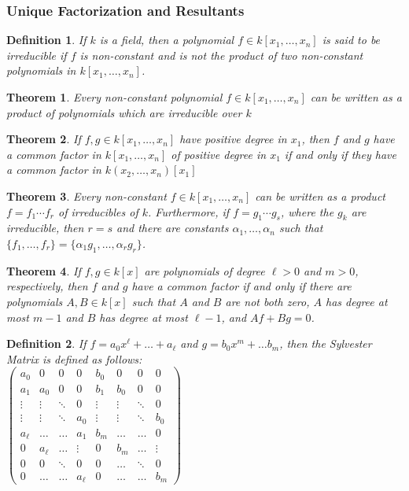 \documentclass{article}
\theoremstyle{mystyle}
\newtheorem{theorem}{Theorem}[section]
\newtheorem{definition}{Definition}[section]
\begin{document}
\subsubsection{Unique Factorization and Resultants}
\begin{definition}
If $k$ is a field, then a polynomial $f\in k[x_1,\hdots ,x_n]$ is said to be irreducible if $f$ is non-constant and is not the product of two non-constant polynomials in $k[x_1,\hdots ,x_n]$.
\end{definition}
\begin{theorem}
Every non-constant polynomial $f\in k[x_1,\hdots ,x_n]$ can be written as a product of polynomials which are irreducible over $k$
\end{theorem}
\begin{theorem}
If $f,g\in k[x_1,\hdots ,x_n]$ have positive degree in $x_1$, then $f$ and $g$ have a common factor in $k[x_1,\hdots ,x_n]$ of positive degree in $x_1$ if and only if they have a common factor in $k(x_2,\hdots, x_n)[x_1]$
\end{theorem}
\begin{theorem}
Every non-constant $f\in k[x_1,\hdots ,x_n]$ can be written as a product $f = f_1\cdots f_r$ of irreducibles of $k$. Furthermore, if $f = g_1\cdots g_s$, where the $g_k$ are irreducible, then $r=s$ and there are constants $\alpha_1,\hdots, \alpha_n$ such that $\{f_1,\hdots, f_r\} = \{\alpha_1 g_1, \hdots, \alpha_r g_r\}$.
\end{theorem}
\begin{theorem}
If $f,g \in k[x]$ are polynomials of degree $\ell>0$ and $m>0$, respectively, then $f$ and $g$ have a common factor if and only if there are polynomials $A,B\in k[x]$ such that $A$ and $B$ are not both zero, $A$ has degree at most $m-1$ and $B$ has degree at most $\ell-1$, and $Af+Bg = 0$.
\end{theorem}
\begin{definition}
If $f = a_0 x^{\ell} +\hdots + a_{\ell}$ and $g = b_0 x^m + \hdots b_m$, then the Sylvester Matrix is defined as follows:\\$
\left({\begin{matrix} a_0 & 0 & 0 & 0 & b_0 & 0 & 0 & 0 \\ a_1 & a_0 & 0 & 0 & b_1 & b_0 & 0 & 0 \\ \vdots & \vdots & \ddots & 0 & \vdots & \vdots & \ddots & 0 \\ \vdots & \vdots & \ddots & a_{0} & \vdots & \vdots & \ddots & b_0 \\ a_{\ell} & \hdots & \hdots & a_{1} & b_{m} & \hdots & \hdots & 0 \\ 0 & a_{\ell} & \hdots & \vdots & 0 & b_{m} & \hdots & \vdots\\ 0 & 0 & \ddots & 0 & 0 & \hdots & \ddots & 0 \\ 0 & \hdots & \hdots & a_{\ell} & 0 & \hdots & \hdots & b_{m} \end{matrix}}\right)$ 
\end{definition}
\end{document}
